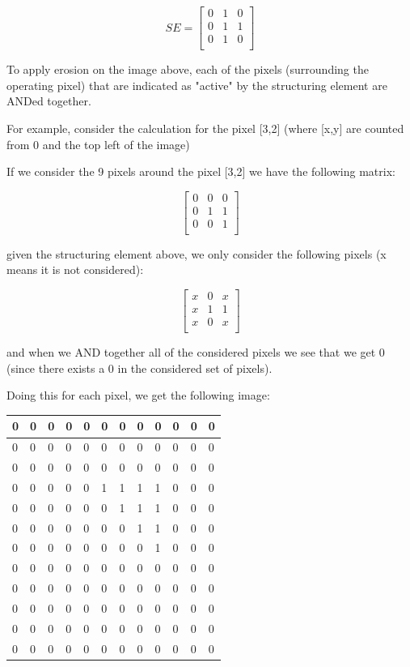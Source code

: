 \documentclass[12pt, letterpaper]{article}
\begin{document}
\[ SE = \begin{bmatrix}0&1&0\\0&1&1\\0&1&0\\ \end{bmatrix} \]


To apply erosion on the image above, each of the pixels (surrounding the operating pixel) that are indicated as "active" by the structuring element are ANDed together.

For example, consider the calculation for the pixel [3,2] (where [x,y] are counted from 0 and the top left of the image)

If we consider the 9 pixels around the pixel [3,2] we have the following matrix:

\[\begin{bmatrix}0&0&0\\0&1&1\\0&0&1\\ \end{bmatrix} \]

given the structuring element above, we only consider the following pixels (x means it is not considered):

\[\begin{bmatrix}x&0&x\\x&1&1\\x&0&x\\ \end{bmatrix} \]

and when we AND together all of the considered pixels we see that we get 0 (since there exists a 0 in the considered set of pixels).

Doing this for each pixel, we get the following image:

\begin{table}[H]
    \centering
    \begin{tabular}{|l|l|l|l|l|l|l|l|l|l|l|l|}
    \hline
        0&0&0&0&0&0&0&0&0&0&0&0 \\ \hline
        0&0&0&0&0&0&0&0&0&0&0&0 \\ \hline
        0&0&0&0&0&0&0&0&0&0&0&0 \\ \hline
        0&0&0&0&0&1&1&1&1&0&0&0 \\ \hline
        0&0&0&0&0&0&1&1&1&0&0&0 \\ \hline
        0&0&0&0&0&0&0&1&1&0&0&0 \\ \hline
        0&0&0&0&0&0&0&0&1&0&0&0 \\ \hline
        0&0&0&0&0&0&0&0&0&0&0&0 \\ \hline
        0&0&0&0&0&0&0&0&0&0&0&0 \\ \hline
        0&0&0&0&0&0&0&0&0&0&0&0 \\ \hline
        0&0&0&0&0&0&0&0&0&0&0&0 \\ \hline
        0&0&0&0&0&0&0&0&0&0&0&0 \\ \hline
    \end{tabular}
\end{table}
\end{document}
